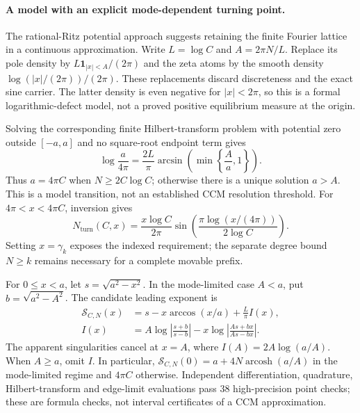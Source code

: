 \paragraph{A model with an explicit mode-dependent turning point.}
The rational-Ritz potential approach\cite{BGV2010} suggests retaining
the finite Fourier lattice in a continuous approximation. Write
$L=\log C$ and $A=2\pi N/L$. Replace its pole density by
$L\mathbf1_{|x|<A}/(2\pi)$ and the zeta atoms by the smooth density
$\log(|x|/(2\pi))/(2\pi)$. These replacements discard discreteness
and the exact sine carrier. The latter density is even negative for
$|x|<2\pi$, so this is a formal logarithmic-defect model, not a proved
positive equilibrium measure at the origin.

Solving the corresponding finite Hilbert-transform problem with
potential zero outside $[-a,a]$ and no square-root endpoint term gives
\begin{equation}\label{eq:action-endpoint}
 \log\frac{a}{4\pi}=\frac{2L}{\pi}
       \arcsin\!\left(\min\left\{\frac{A}{a},1\right\}\right).
\end{equation}
Thus $a=4\pi C$ when $N\geq2C\log C$; otherwise there is a unique
solution $a>A$. This is a model transition, not an established CCM
resolution threshold. For $4\pi<x<4\pi C$, inversion gives
\begin{equation}\label{eq:action-mode-threshold}
 N_{\mathrm{turn}}(C,x)=\frac{x\log C}{2\pi}
       \sin\!\left(\frac{\pi\log(x/(4\pi))}{2\log C}\right).
\end{equation}
Setting $x=\gamma_k$ exposes the indexed requirement; the separate
degree bound $N\geq k$ remains necessary for a complete movable prefix.

For $0\leq x<a$, let $s=\sqrt{a^2-x^2}$. In the mode-limited case
$A<a$, put $b=\sqrt{a^2-A^2}$. The candidate leading exponent is
\begin{align}
 \mathcal S_{C,N}(x)&=s-x\arccos(x/a)+\frac L\pi I(x),
       \label{eq:finite-mode-action}\\
 I(x)&=A\log\left|\frac{s+b}{s-b}\right|
       -x\log\left|\frac{As+bx}{As-bx}\right|.\nonumber
\end{align}
The apparent singularities cancel at $x=A$, where
$I(A)=2A\log(a/A)$. When $A\geq a$, omit $I$. In particular,
$\mathcal S_{C,N}(0)=a+4N\operatorname{arcosh}(a/A)$ in the
mode-limited regime and $4\pi C$ otherwise. Independent differentiation,
quadrature, Hilbert-transform and edge-limit evaluations pass 38
high-precision point checks; these are formula checks, not interval
certificates of a CCM approximation.

